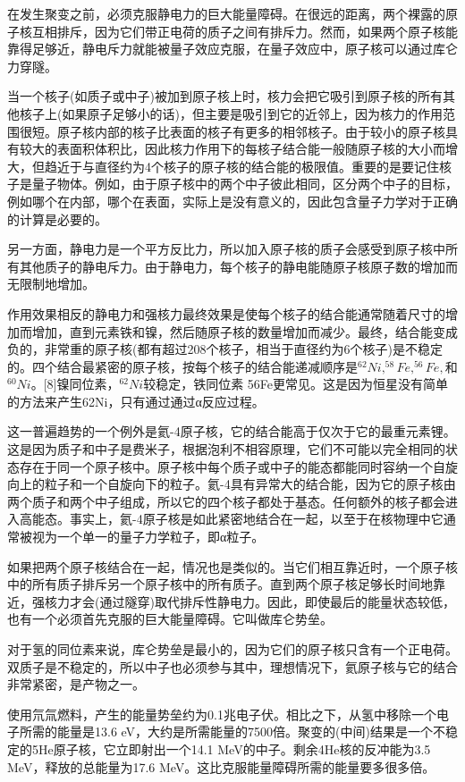 在发生聚变之前，必须克服静电力的巨大能量障碍。在很远的距离，两个裸露的原子核互相排斥，因为它们带正电荷的质子之间有排斥力。然而，如果两个原子核能靠得足够近，静电斥力就能被量子效应克服，在量子效应中，原子核可以通过库仑力穿隧。

当一个核子(如质子或中子)被加到原子核上时，核力会把它吸引到原子核的所有其他核子上(如果原子足够小的话)，但主要是吸引到它的近邻上，因为核力的作用范围很短。原子核内部的核子比表面的核子有更多的相邻核子。由于较小的原子核具有较大的表面积体积比，因此核力作用下的每核子结合能一般随原子核的大小而增大，但趋近于与直径约为4个核子的原子核的结合能的极限值。重要的是要记住核子是量子物体。例如，由于原子核中的两个中子彼此相同，区分两个中子的目标，例如哪个在内部，哪个在表面，实际上是没有意义的，因此包含量子力学对于正确的计算是必要的。

另一方面，静电力是一个平方反比力，所以加入原子核的质子会感受到原子核中所有其他质子的静电斥力。由于静电力，每个核子的静电能随原子核原子数的增加而无限制地增加。

作用效果相反的静电力和强核力最终效果是使每个核子的结合能通常随着尺寸的增加而增加，直到元素铁和镍，然后随原子核的数量增加而减少。最终，结合能变成负的，非常重的原子核(都有超过208个核子，相当于直径约为6个核子)是不稳定的。四个结合最紧密的原子核，按每个核子的结合能递减顺序是$^{62}Ni,^{58}Fe,^{56}Fe,$和$^{60}Ni$。[8]镍同位素，$^{62}Ni$较稳定，铁同位素 56Fe更常见。这是因为恒星没有简单的方法来产生62Ni，只有通过通过α反应过程。

这一普遍趋势的一个例外是氦-4原子核，它的结合能高于仅次于它的最重元素锂。这是因为质子和中子是费米子，根据泡利不相容原理，它们不可能以完全相同的状态存在于同一个原子核中。原子核中每个质子或中子的能态都能同时容纳一个自旋向上的粒子和一个自旋向下的粒子。氦-4具有异常大的结合能，因为它的原子核由两个质子和两个中子组成，所以它的四个核子都处于基态。任何额外的核子都会进入高能态。事实上，氦-4原子核是如此紧密地结合在一起，以至于在核物理中它通常被视为一个单一的量子力学粒子，即α粒子。

如果把两个原子核结合在一起，情况也是类似的。当它们相互靠近时，一个原子核中的所有质子排斥另一个原子核中的所有质子。直到两个原子核足够长时间地靠近，强核力才会(通过隧穿)取代排斥性静电力。因此，即使最后的能量状态较低，也有一个必须首先克服的巨大能量障碍。它叫做库仑势垒。

对于氢的同位素来说，库仑势垒是最小的，因为它们的原子核只含有一个正电荷。双质子是不稳定的，所以中子也必须参与其中，理想情况下，氦原子核与它的结合非常紧密，是产物之一。

使用氘氚燃料，产生的能量势垒约为0.1兆电子伏。相比之下，从氢中移除一个电子所需的能量是13.6 eV，大约是所需能量的7500倍。聚变的(中间)结果是一个不稳定的5He原子核，它立即射出一个14.1 MeV的中子。剩余4He核的反冲能为3.5 MeV，释放的总能量为17.6 MeV。这比克服能量障碍所需的能量要多很多倍。